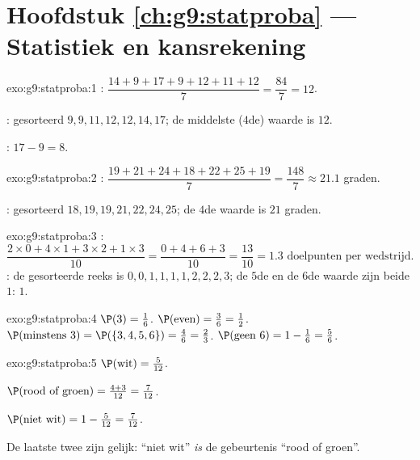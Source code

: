 \section*{Hoofdstuk \ref{ch:g9:statproba} --- Statistiek en kansrekening}

\begin{solution}{exo:g9:statproba:1}
: $\dfrac{14 + 9 + 17 + 9 + 12 + 11 + 12}{7} = \dfrac{84}{7} = 12$.

: gesorteerd $9, 9, 11, 12, 12, 14, 17$; de middelste ($4$de) waarde is
$12$.

: $17 - 9 = 8$.
\end{solution}

\begin{solution}{exo:g9:statproba:2}
: $\dfrac{19 + 21 + 24 + 18 + 22 + 25 + 19}{7} = \dfrac{148}{7}
\approx 21.1$ graden.

: gesorteerd $18, 19, 19, 21, 22, 24, 25$; de $4$de waarde is $21$
graden.
\end{solution}

\begin{solution}{exo:g9:statproba:3}
:
\[
\frac{2 \times 0 + 4 \times 1 + 3 \times 2 + 1 \times 3}{10}
= \frac{0 + 4 + 6 + 3}{10} = \frac{13}{10} = 1.3
\text{ doelpunten per wedstrijd.}
\]
: de gesorteerde reeks is $0,0,1,1,1,1,2,2,2,3$; de $5$de en de $6$de
waarde zijn beide $1$:  $1$.
\end{solution}

\begin{solution}{exo:g9:statproba:4}
$\P(3) = \frac16$. \quad
$\P(\text{even}) = \frac36 = \frac12$. \quad
$\P(\text{minstens } 3) = \P(\{3,4,5,6\}) = \frac46 = \frac23$. \quad
$\P(\text{geen } 6) = 1 - \frac16 = \frac56$.
\end{solution}

\begin{solution}{exo:g9:statproba:5}
$\P(\text{wit}) = \frac{5}{12}$.

$\P(\text{rood of groen}) = \frac{4 + 3}{12} = \frac{7}{12}$.

$\P(\text{niet wit}) = 1 - \frac{5}{12} = \frac{7}{12}$.

De laatste twee zijn gelijk: ``niet wit'' \emph{is} de gebeurtenis ``rood of
groen''.
\end{solution}

